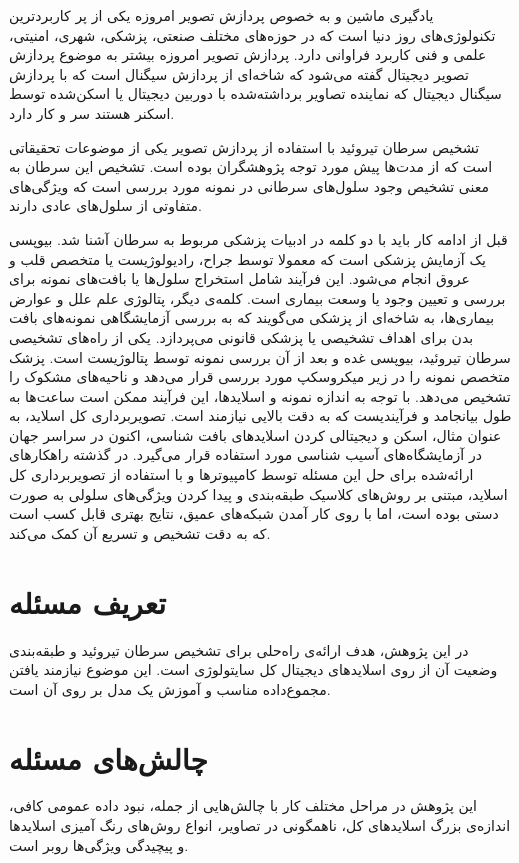 
یادگیری ماشین و به خصوص پردازش تصویر امروزه یکی از پر کاربردترین تکنولوژی‌های روز دنیا است که در حوزه‌های مختلف صنعتی، پزشکی، شهری، امنیتی، علمی و فنی کاربرد فراوانی دارد.
پردازش تصویر امروزه بیشتر به موضوع پردازش تصویر دیجیتال گفته می‌شود که شاخه‌ای از پردازش سیگنال است که با پردازش سیگنال دیجیتال که نماینده تصاویر برداشته‌شده با دوربین دیجیتال یا اسکن‌شده توسط اسکنر هستند سر و کار دارد.

تشخیص سرطان تیروئید با استفاده از پردازش تصویر یکی از موضوعات تحقیقاتی است که از مدت‌ها پیش مورد توجه پژوهشگران بوده است. تشخیص این سرطان به معنی تشخیص وجود سلول‌های سرطانی در نمونه مورد بررسی است که ویژگی‌های متفاوتی از سلول‌های عادی دارند.

قبل از ادامه کار باید با دو کلمه در ادبیات پزشکی مربوط به سرطان آشنا شد.
بیوپسی یک آزمایش پزشکی است که معمولا توسط جراح، رادیولوژیست یا متخصص قلب و عروق انجام می‌شود.
این فرآیند شامل استخراج سلول‌ها یا بافت‌های نمونه برای بررسی و تعیین وجود یا وسعت بیماری است. کلمه‌ی دیگر، پتالوژی علم علل و عوارض بیماری‌ها، به شاخه‌ای از پزشکی می‌گویند که به بررسی آزمایشگاهی نمونه‌های بافت بدن برای اهداف تشخیصی یا پزشکی قانونی می‌پردازد.
یکی از راه‌های تشخیصی سرطان تیروئید، بیوپسی غده و بعد از آن بررسی نمونه توسط پتالوژیست است. پزشک متخصص نمونه را در زیر میکروسکپ مورد بررسی قرار می‌دهد و ناحیه‌های مشکوک را تشخیص می‌دهد. با توجه به اندازه نمونه و اسلاید‌ها، این فرآیند ممکن است ساعت‌ها به طول بیانجامد و فرآیندیست که به دقت بالایی نیازمند است.
تصویربرداری کل اسلاید، به عنوان مثال، اسکن و دیجیتالی کردن اسلایدهای بافت شناسی، اکنون در سراسر جهان در آزمایشگاه‌های آسیب شناسی مورد استفاده قرار می‌گیرد.
در گذشته راهکارهای ارائه‌شده برای حل این مسئله توسط کامپیوتر‌ها و با استفاده از تصویربرداری کل اسلاید، مبتنی بر روش‌های کلاسیک طبقه‌بندی و پیدا کردن ویژگی‌های سلولی به صورت دستی بوده است، اما با روی کار آمدن شبکه‌های عمیق، نتایج بهتری قابل کسب است که به دقت تشخیص و تسریع آن کمک می‌کند.

\section{تعریف مسئله}\label{sec:تعریف مسئله}
در این پژوهش، هدف ارائه‌ی راه‌حلی برای تشخیص سرطان تیروئید و طبقه‌بندی وضعیت آن از روی اسلاید‌های دیجیتال کل سایتولوژی است.
این موضوع نیازمند یافتن مجموع‌داده مناسب و آموزش یک مدل بر روی آن است.

\section{چالش‌های مسئله}\label{sec:چالش‌های مسئله}
این پژوهش در مراحل مختلف کار با چالش‌هایی از جمله، نبود داده عمومی کافی، اندازه‌ی بزرگ اسلاید‌های کل، ناهمگونی در تصاویر، انواع روش‌های رنگ آمیزی اسلایدها و پیچیدگی ویژگی‌ها روبر است.



